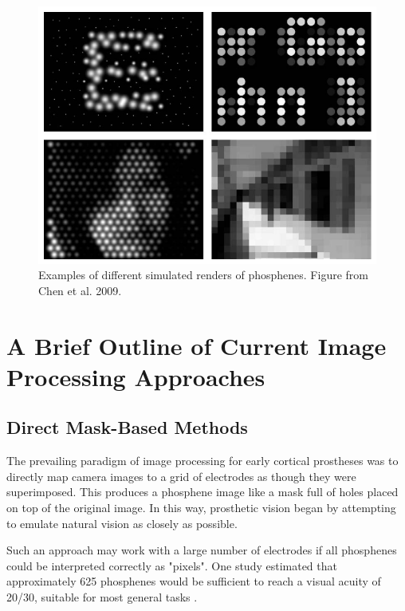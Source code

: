 \documentclass[a4paper,11pt,openany]{book}
\begin{document}
\begin{figure}[htbp]
\centering
\includegraphics[width=.9\linewidth]{./graphics/litreview/simulated.png}
\caption[Examples of different simulated renders of phosphenes]{\label{fig:org6b164da}
Examples of different simulated renders of phosphenes. Figure from Chen et al. 2009. \cite{chen_simulating_2009-1}}
\end{figure}

\section*{A Brief Outline of Current Image Processing Approaches}
\label{sec:orgcf01bc1}
\subsection*{Direct Mask-Based Methods}
\label{sec:org4468183}

The prevailing paradigm of image processing for early cortical prostheses was to directly map camera images to a grid of electrodes as though they were superimposed. \cite{schmidt_feasibility_1996,dobelle_artificial_2000}
This produces a phosphene image like a mask full of holes placed on top of the original image.
In this way, prosthetic vision began by attempting to emulate natural vision as closely as possible.

Such an approach may work with a large number of electrodes if all phosphenes could be interpreted correctly as "pixels".
One study estimated that approximately 625 phosphenes would be sufficient to reach a visual acuity of 20/30, suitable for most general tasks \cite{cha_simulation_1992}.
\end{document}
